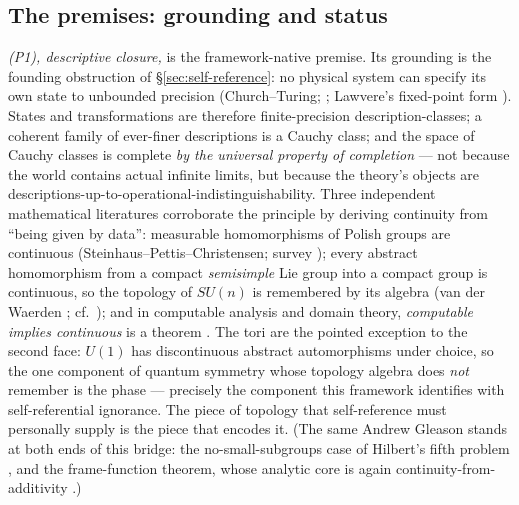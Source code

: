 \subsection{The premises: grounding and status}
\label{app:cont-premises}

\emph{(P1), descriptive closure,} is the framework-native premise. Its grounding is the
founding obstruction of \S\ref{sec:self-reference}: no physical system can specify its
own state to unbounded precision (Church--Turing; \cite{popper1950}; Lawvere's
fixed-point form \cite{lawvere1969}). States and transformations are therefore
finite-precision description-classes; a coherent family of ever-finer descriptions is a
Cauchy class; and the space of Cauchy classes is complete \emph{by the universal property
of completion} --- not because the world contains actual infinite limits, but because the
theory's objects are descriptions-up-to-operational-indistinguishability. Three
independent mathematical literatures corroborate the principle by deriving continuity
from ``being given by data'': measurable homomorphisms of Polish groups are continuous
(Steinhaus--Pettis--Christensen; survey \cite{rosendal2009}); every abstract homomorphism
from a compact \emph{semisimple} Lie group into a compact group is continuous, so the
topology of $SU(n)$ is remembered by its algebra (van der Waerden
\cite{vanderwaerden1933}; cf.\ \cite{tsankov2013}); and in computable analysis and domain
theory, \emph{computable implies continuous} is a theorem \cite{weihrauch2000,
abramskyjung, smyth}. The tori are the pointed exception to the second face: $U(1)$ has
discontinuous abstract automorphisms under choice, so the one component of quantum
symmetry whose topology algebra does \emph{not} remember is the phase --- precisely the
component this framework identifies with self-referential ignorance. The piece of
topology that self-reference must personally supply is the piece that encodes it.
(The same Andrew Gleason stands at both ends of this bridge: the no-small-subgroups case
of Hilbert's fifth problem \cite{gleason1952}, and the frame-function theorem, whose
analytic core is again continuity-from-additivity \cite{gleason1957}.)

